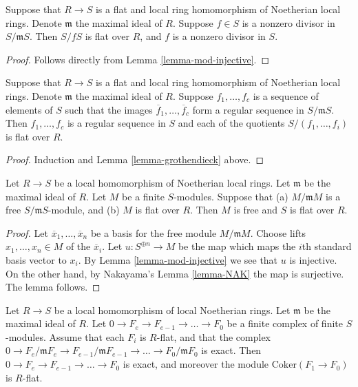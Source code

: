 \begin{lemma}
\label{lemma-grothendieck}
Suppose that $R \to S$ is a flat and local ring homomorphism of Noetherian
local rings. Denote $\mathfrak m$ the maximal ideal of $R$.
Suppose $f \in S$ is a nonzero divisor in $S/{\mathfrak m}S$.
Then $S/fS$ is flat over $R$, and $f$ is a nonzero divisor in $S$.
\end{lemma}

\begin{proof}
Follows directly from Lemma \ref{lemma-mod-injective}.
\end{proof}

\begin{lemma}
\label{lemma-grothendieck-regular-sequence}
Suppose that $R \to S$ is a flat and local ring homomorphism of Noetherian
local rings. Denote $\mathfrak m$ the maximal ideal of $R$.
Suppose $f_1, \ldots, f_c$ is a sequence of elements of
$S$ such that the images $\overline{f}_1, \ldots, \overline{f}_c$
form a regular sequence in $S/{\mathfrak m}S$.
Then $f_1, \ldots, f_c$ is a regular sequence in $S$ and each
of the quotients $S/(f_1, \ldots, f_i)$ is flat over $R$.
\end{lemma}

\begin{proof}
Induction and Lemma \ref{lemma-grothendieck} above.
\end{proof}

\begin{lemma}
\label{lemma-free-fibre-flat-free}
Let $R \to S$ be a local homomorphism of Noetherian
local rings. Let $\mathfrak m$ be the maximal
ideal of $R$. Let $M$ be a finite $S$-modules.
Suppose that (a) $M/\mathfrak mM$
is a free $S/\mathfrak mS$-module, and (b) $M$ is flat over $R$.
Then $M$ is free and $S$ is flat over $R$.
\end{lemma}

\begin{proof}
Let $\overline{x}_1, \ldots, \overline{x}_n$ be a basis
for the free module $M/\mathfrak mM$. Choose lifts
$x_1, \ldots, x_n \in M$ of the $\overline{x}_i$. Let
$u : S^{\oplus n} \to M$ be the map which maps the $i$th
standard basis vector to $x_i$. By Lemma \ref{lemma-mod-injective}
we see that $u$ is injective. On the other hand, by
Nakayama's Lemma \ref{lemma-NAK} the map is surjective. The
lemma follows.
\end{proof}

\begin{lemma}
\label{lemma-complex-exact-mod}
Let $R \to S$ be a local homomorphism of local Noetherian
rings. Let $\mathfrak m$ be the maximal ideal of $R$.
Let $0 \to F_e \to F_{e-1} \to \ldots \to F_0$
be a finite complex of finite $S$-modules. Assume that
each $F_i$ is $R$-flat, and that the complex
$0 \to F_e/\mathfrak m F_e \to F_{e-1}/\mathfrak m F_{e-1}
\to \ldots \to F_0 / \mathfrak m F_0$ is exact.
Then $0 \to F_e \to F_{e-1} \to \ldots \to F_0$
is exact, and moreover the module
$\text{Coker}(F_1 \to F_0)$ is $R$-flat.
\end{lemma}

